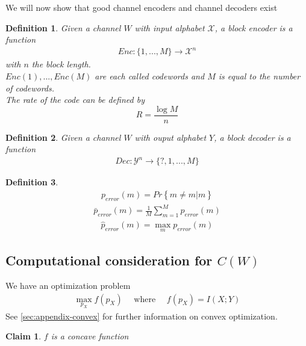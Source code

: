 \documentclass[twoside]{article}
\newtheorem{claim}{Claim}[section]
\newtheorem{definition}{Definition}[section]
\theoremstyle{definition} %
\renewcommand{\Pr}[1]{Pr\left\{#1\right\}}
\def\X{\mathcal{X}}
\def\Y{\mathcal{Y}}
\begin{document}
We will now show that good channel encoders and channel decoders exist

\begin{definition}
  Given a channel $W$ with input alphabet $\X$, a block encoder is a function
  \begin{align*}
    Enc: \{1, ..., M\} \rightarrow \X^n
  \end{align*}
  with $n$ the block length.\\
  $Enc(1), ..., Enc(M)$ are each called codewords and $M$ is equal to the number of codewords.\\
  The rate of the code can be defined by
  $$ R = \frac{\log M}{n} $$
\end{definition}
\begin{definition}
  Given a channel $W$ with ouput alphabet $Y$, a block decoder is a function
  \begin{align*}
    Dec: \Y^n \rightarrow \{ ?, 1, ..., M\}
  \end{align*}
\end{definition}

\begin{definition}
  \begin{align*}
    p_{error}(m) = \Pr{\hat{m} \neq m | m}
  \end{align*}
  \begin{align*}
    \bar{p}_{error}(m) = \frac{1}{M} \sum_{m=1}^M p_{error}(m)
  \end{align*}
  \begin{align*}
    \hat{p}_{error}(m) = \max_{m} p_{error}(m)
  \end{align*}
\end{definition}



\subsection{Computational consideration for $C(W)$}
We have an optimization problem
  \begin{align*}
    \max_{p_X} f(p_X) \quad \text{ where } \quad f(p_X) = I(X ; Y)
  \end{align*}
See \cref{sec:appendix-convex} for further information on convex optimization.
  \begin{claim}
    $f$ is a concave function
  \end{claim}
\end{document}

